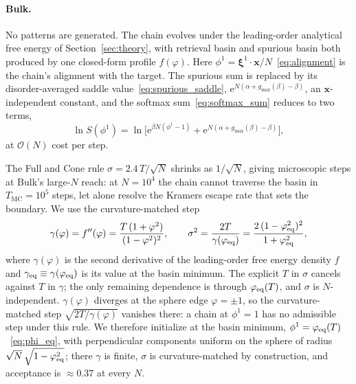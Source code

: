 \documentclass[letterpaper]{article} %
\newcommand{\bxi}{\boldsymbol{\xi}}
\newcommand{\bx}{\bm{x}}
\newcommand{\e}{{\mathrm{e}}}
\newcommand{\Bnet}{\beta}
\newcommand{\gmax}{g_{\max}}
\begin{document}
\paragraph{Bulk.}
No patterns are generated.  The chain evolves under the leading-order
analytical free energy of Section~\ref{sec:theory}, with retrieval
basin and spurious basin both produced by one closed-form profile
$f(\varphi)$.  Here $\phi^1 = \bxi^1 \cdot \bx /
N$~\eqref{eq:alignment} is the chain's alignment with the target.
The spurious sum is replaced by its disorder-averaged saddle
value~\eqref{eq:spurious_saddle},
$\e^{N(\alpha + \gmax(\Bnet) - \Bnet)}$, an $\bx$-independent
constant, and the softmax sum~\eqref{eq:softmax_sum} reduces to
two terms,
\begin{equation}
\ln S(\phi^1) = \ln\!\bigl[ \e^{\Bnet N (\phi^1 - 1)}
                + \e^{N (\alpha + \gmax(\Bnet) - \Bnet)} \bigr],
\label{eq:bulk-logS}
\end{equation}
at $\mathcal{O}(N)$ cost per step.

The Full and Cone rule $\sigma = 2.4\,T/\sqrt N$ shrinks as
$1/\sqrt N$, giving microscopic steps at Bulk's large-$N$ reach: at
$N = 10^4$ the chain cannot traverse the basin in
$T_{\mathrm{MC}} = 10^5$ steps, let alone resolve the Kramers escape
rate that sets the boundary.  We use the curvature-matched step
\begin{equation}
\gamma(\varphi) = f''(\varphi)
              = \frac{T\,(1 + \varphi^2)}{(1 - \varphi^2)^2},
\qquad
\sigma^2 = \frac{2 T}{\gamma(\varphi_{\rm eq})}
       = \frac{2\,(1 - \varphi_{\rm eq}^2)^2}{1 + \varphi_{\rm eq}^2},
\label{eq:bulk-sigma}
\end{equation}
where $\gamma(\varphi)$ is the second derivative of the leading-order
free energy density $f$ and $\gamma_{\rm eq} \equiv \gamma(\varphi_{\rm eq})$
is its value at the basin minimum.  The explicit $T$ in $\sigma$
cancels against $T$ in $\gamma$; the only remaining dependence is
through $\varphi_{\rm eq}(T)$, and $\sigma$ is $N$-independent.
$\gamma(\varphi)$ diverges at the sphere edge $\varphi = \pm 1$, so
the curvature-matched step $\sqrt{2T/\gamma(\varphi)}$ vanishes
there: a chain at $\phi^1 = 1$ has no admissible step under this
rule.  We therefore initialize at the basin minimum,
$\phi^1 = \varphi_{\rm eq}(T)$~\eqref{eq:phi_eq}, with perpendicular
components uniform on the sphere of radius
$\sqrt N \,\sqrt{1 - \varphi_{\rm eq}^2}$; there $\gamma$ is finite,
$\sigma$ is curvature-matched by construction, and acceptance is
$\approx 0.37$ at every $N$.
\end{document}
